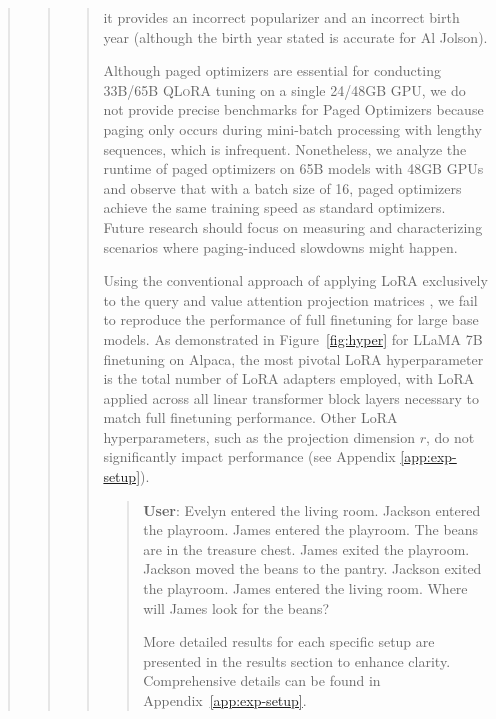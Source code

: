 \begin{quote}
\begin{quote}
\begin{quote}
it provides an incorrect popularizer and an incorrect birth year (although the birth year stated is accurate for Al Jolson).  

Although paged optimizers are essential for conducting 33B/65B \textsc{QLoRA} tuning on a single 24/48GB GPU, we do not provide precise benchmarks for Paged Optimizers because paging only occurs during mini-batch processing with lengthy sequences, which is infrequent. Nonetheless, we analyze the runtime of paged optimizers on 65B models with 48GB GPUs and observe that with a batch size of 16, paged optimizers achieve the same training speed as standard optimizers. Future research should focus on measuring and characterizing scenarios where paging-induced slowdowns might happen.

Using the conventional approach of applying LoRA exclusively to the query and value attention projection matrices \citep{hu2021lora}, we fail to reproduce the performance of full finetuning for large base models. As demonstrated in Figure~\ref{fig:hyper} for LLaMA 7B finetuning on Alpaca, the most pivotal LoRA hyperparameter is the total number of LoRA adapters employed, with LoRA applied across all linear transformer block layers necessary to match full finetuning performance. Other LoRA hyperparameters, such as the projection dimension $r$, do not significantly impact performance (see Appendix \ref{app:exp-setup}).

\begin{quote}
    \textbf{User}: Evelyn entered the living room. Jackson entered the playroom. James entered the playroom. The beans are in the treasure chest. James exited the playroom. Jackson moved the beans to the pantry. Jackson exited the playroom. James entered the living room. Where will James look for the beans?

More detailed results for each specific setup are presented in the results section to enhance clarity. Comprehensive details can be found in Appendix~\ref{app:exp-setup}.


\end{quote}
\end{quote}
\end{quote}
\end{quote}
